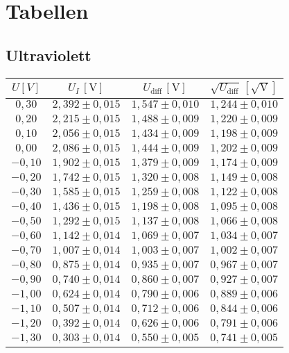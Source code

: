 \onecolumn
\chapter{Tabellen}

\section{Ultraviolett}
    \begin{table}[h!]
    \centering
    \begin{tabular}{c | ccc}
    \hline
    $U [V]$ & $U_I \, [\mathrm{V}]$ & $U_{\text{diff}} \, [\mathrm{V}]$ & $\sqrt{U_{\text{diff}}} \, [\mathrm{\sqrt{V}}]$ \\
    \hline
    $0,30$ & $2,392 \pm 0,015$ & $1,547 \pm 0,010$ & $1,244 \pm 0,010$ \\
    $0,20$ & $2,215 \pm 0,015$ & $1,488 \pm 0,009$ & $1,220 \pm 0,009$ \\
    $0,10$ & $2,056 \pm 0,015$ & $1,434 \pm 0,009$ & $1,198 \pm 0,009$ \\
    $0,00$ & $2,086 \pm 0,015$ & $1,444 \pm 0,009$ & $1,202 \pm 0,009$ \\
    $-0,10$ & $1,902 \pm 0,015$ & $1,379 \pm 0,009$ & $1,174 \pm 0,009$ \\
    $-0,20$ & $1,742 \pm 0,015$ & $1,320 \pm 0,008$ & $1,149 \pm 0,008$ \\
    $-0,30$ & $1,585 \pm 0,015$ & $1,259 \pm 0,008$ & $1,122 \pm 0,008$ \\
    $-0,40$ & $1,436 \pm 0,015$ & $1,198 \pm 0,008$ & $1,095 \pm 0,008$ \\
    $-0,50$ & $1,292 \pm 0,015$ & $1,137 \pm 0,008$ & $1,066 \pm 0,008$ \\
    $-0,60$ & $1,142 \pm 0,014$ & $1,069 \pm 0,007$ & $1,034 \pm 0,007$ \\
    $-0,70$ & $1,007 \pm 0,014$ & $1,003 \pm 0,007$ & $1,002 \pm 0,007$ \\
    $-0,80$ & $0,875 \pm 0,014$ & $0,935 \pm 0,007$ & $0,967 \pm 0,007$ \\
    $-0,90$ & $0,740 \pm 0,014$ & $0,860 \pm 0,007$ & $0,927 \pm 0,007$ \\
    $-1,00$ & $0,624 \pm 0,014$ & $0,790 \pm 0,006$ & $0,889 \pm 0,006$ \\
    $-1,10$ & $0,507 \pm 0,014$ & $0,712 \pm 0,006$ & $0,844 \pm 0,006$ \\
    $-1,20$ & $0,392 \pm 0,014$ & $0,626 \pm 0,006$ & $0,791 \pm 0,006$ \\
    $-1,30$ & $0,303 \pm 0,014$ & $0,550 \pm 0,005$ & $0,741 \pm 0,005$ \\

\end{tabular}
\end{table}
